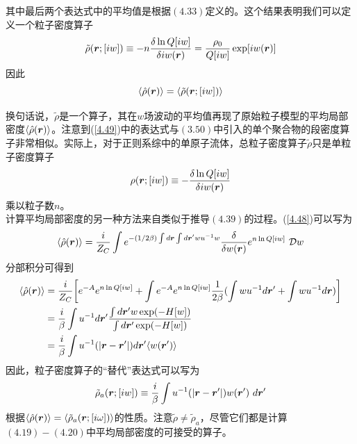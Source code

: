 其中最后两个表达式中的平均值是根据$(4.33)$定义的。这个结果表明我们可以定义一个粒子密度算子\\
\begin{equation}
\tilde{ \rho }(\bm{r};[i w]) \equiv -n \frac{\delta \ln Q[i w]}{\delta i w (\bm{r})} = \frac{\rho _{0}}{Q[i w]} \exp [i w(\bm{r})]
\label{4.49}
\end{equation}
因此\\
\begin{equation}
\langle \hat{ \rho }(\bm{r}) \rangle = \langle \tilde{ \rho } (\bm{r};[i w ]) \rangle
\end{equation}

换句话说，$\tilde{ \rho }$是一个算子，其在$ w $场波动的平均值再现了原始粒子模型的平均局部密度$ \langle \hat{ \rho }(\bm{r}) \rangle $。注意到(\ref{4.49})中的表达式与$(3.50)$中引入的单个聚合物的段密度算子非常相似。实际上，对于正则系综中的单原子流体，总粒子密度算子$ \tilde{ \rho } $只是单粒子密度算子\\
\begin{equation}
\rho (\bm{r};[i w]) \equiv - \frac{\delta \ln Q[i w]}{\delta i w (\bm{r})}
\end{equation}
乘以粒子数$n$。\\

计算平均局部密度的另一种方法来自类似于推导$(4.39)$的过程。(\ref{4.48})可以写为\\
\begin{equation}
\langle \hat{ \rho } (\bm{r}) \rangle = \frac{i}{Z_{C}} \int e^{- (1/2 \beta ) \int d\bm{r} \int d\bm{r}' w u^{-1} w } \frac{ \delta }{\delta w (\bm{r})} e^{n \ln Q[i w ]} ~\mathcal{D} w
\end{equation}
分部积分可得到\\
\begin{equation}
\begin{aligned}
\langle \hat{ \rho } (\bm{r}) \rangle &=\frac{i}{Z_{C}} \bigg[ e^{-A} e^{n \ln Q[i w ]}+\int e^{-A} e^{n \ln Q[i w ]} \frac{1}{2 \beta}(\int wu^{-1}d\bm{r}'+\int wu^{-1}d\bm{r}) \bigg ]\\&=\frac{i}{\beta}\int u^{-1} d \bm{r}' \frac{\int d\bm{r}'w \exp(-H[w])}{\int d\bm{r}' \exp(-H[w])} \\&= \frac{i}{ \beta } \int u^{-1} (|\bm{r}-\bm{r}'|) d\bm{r}' \langle w (\bm{r}') \rangle 
\end{aligned}
\label{4.53}
\end{equation}
因此，粒子密度算子的“替代”表达式可以写为\\
\begin{equation}
\tilde{ \rho }_{a}(\bm{r};[i w ]) \equiv \frac{i}{ \beta } \int  u^{-1}(|\bm{r}-\bm{r}'|) w (\bm{r}')~d\bm{r}'
\label{4.54}
\end{equation}
根据$\langle \hat{ \rho }(\bm{r}) \rangle = \langle \tilde{ \rho }_{a}(\bm{r};[i \omega ]) \rangle$的性质。注意$\tilde{ \rho } \neq \tilde{ \rho }_{a}$，尽管它们都是计算$(4.19)-(4.20)$中平均局部密度的可接受的算子。\\

